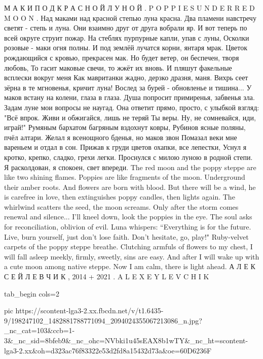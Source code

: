М А К И   П О Д   К Р А С Н О Й   Л У Н О Й  . 
P O P P I E S   U N D E R   R E D   M O O N  .
Над маками над красной степью           луна красна. 
Два пламени навстречу светят -          степь и луна. 
Они взаимно друг от друга                     вобрали яр. 
И вот теперь по всей округе             струит пожар. 
На стеблях пурпурные капли,             упав с луны, 
Осколки розовые - маки                        огня полны. 
И под землёй лучатся корни,              янтаря мрак. 
Цветок рождающийся с кровью,  прекрасен мак. 
Но будет ветер, он беспечен,           творя любовь, 
То гасит маковые свечи,            то жжёт их вновь. 
И пляшут факельные всплески         вокруг меня 
Как мавританки   жадно, дерзко    дразня, маня. 
Вихрь сеет зёрна в те мгновенья,  кричит луна! 
Вослед за бурей - обновленье            и тишина... 
У маков встану на колени,         глаза в глаза. 
Душа попросит примиренья,   забвенья зла. 
Задам луне мои вопросы                  не наугад. 
Она ответит прямо, просто, с улыбкой взгляд: 
"Всё впрок. Живи и обжигайся, лишь не теряй 
Ты веры. Ну, не сомневайся,              иди, играй!" 
Румяным бархатом багряным вздохнут ковры, 
Рубинов ясные поляны,                    пчёл алтари. 
Желал я всенощного бденья,     но маков звон 
Помазал веки мне вареньем      и отдал в сон. 
Прижав к груди цветов охапки, все лепестки, 
Уснул я кротко, крепко, сладко, грехи легки. 
Проснулся с милою луною в родной степи. 
Я расколдован, я спокоен,   свет впереди. 
The red moon and the poppy steppe   are like two shining flames. 
Poppies are like fragments of the moon.  Underground their amber 
roots. And flowers are born with blood. But there will be a wind, he is 
carefree in love, then extinguishes poppy candles,     then lights again. 
The whirlwind scatters the seed, the moon screams.        Only after the 
storm comes renewal and silence...  I'll kneel down, look the poppies in 
the eye. The soul asks for reconciliation, oblivion of evil. Luna whispers: 
“Everything is for the future.         Live, burn yourself, just don't lose faith. 
Don't hesitate, go, play!"             Ruby-velvet carpets of the poppy steppe 
breathe. Clutching armfuls of flowers to my chest,          I will fall asleep 
meekly, firmly, sweetly, sins are easy.     And after I will wake up with a 
cute moon among native steppe. Now I am calm, there is light ahead.
А Л Е К С Е Й   Л Е В Ч И К  ,   2014 + 2021 .   A L E X E Y   L E V C H I K 

\ifcmt
  tab_begin cols=2

     pic https://scontent-lga3-2.xx.fbcdn.net/v/t1.6435-9/198247102_1482881788771094_2094024355067213086_n.jpg?_nc_cat=103&ccb=1-3&_nc_sid=8bfeb9&_nc_ohc=NVbki1u45sEAX8b1wTY&_nc_ht=scontent-lga3-2.xx&oh=d323ac76f83322e53d2fd8a15432d73a&oe=60D6236F

